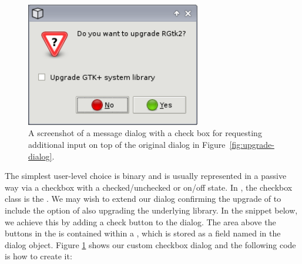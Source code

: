 \documentclass[article,shortnames]{jss}
\begin{document}
\begin{figure}[tbp]
  \begin{center}
    \includegraphics[width=3in]{checkbox-dialog.png}
    \caption{\label{fig:checkbox-dialog}A screenshot of a message
dialog
      with a 
      check box for requesting additional input on top of the
      original dialog in Figure~\ref{fig:upgrade-dialog}.}
  \end{center}
\end{figure}

The simplest user-level choice is binary and is usually represented in
a passive way via a checkbox with a checked/unchecked or  on/off 
state. In , the checkbox class is the
. We may wish to extend our dialog confirming the
upgrade of  to include the option of also upgrading the
underlying   library. In the snippet below, we
achieve this by adding a
check button to the dialog.  The area above the buttons in the
 is contained within a , which is stored
as a field named  in the dialog object. Figure
\ref{fig:checkbox-dialog} shows
our custom checkbox dialog and the following code is how to create it:
\end{document}
